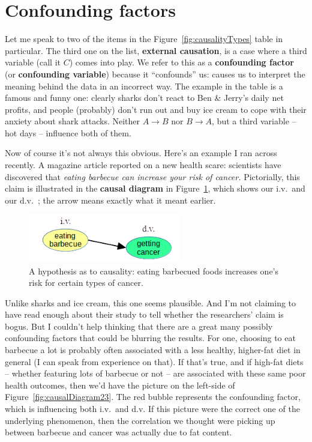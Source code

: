 \section{Confounding factors}


Let me speak to two of the items in the Figure~\ref{fig:causalityTypes} table
in particular. The third one on the list, \textbf{external causation}, is a
case where a third variable (call it $C$) comes into play. We refer to this as
a \textbf{confounding factor} (or \textbf{confounding variable}) because it
``confounds'' us: causes us to interpret the meaning behind the data in an
incorrect way. The example in the table is a famous and funny one: clearly
sharks don't react to Ben \& Jerry's daily net profits, and people (probably)
don't run out and buy ice cream to cope with their anxiety about shark attacks.
Neither $A \rightarrow B$ nor $B \rightarrow A$, but a third variable -- hot
days -- influence both of them.

\label{barbecue}

Now of course it's not always this obvious. Here's an example I ran across
recently. A magazine article reported on a new health scare: scientists have
discovered that \textit{eating barbecue can increase your risk of cancer.}
Pictorially, this claim is illustrated in the \textbf{causal diagram} in
Figure~\ref{fig:causalDiagram}, which shows our i.v.~and our d.v.~; the arrow
means exactly what it meant earlier.

\begin{figure}[ht]
\centering
\includegraphics[width=0.6\textwidth]{causalDiagram.png}
\caption{A hypothesis as to causality: eating barbecued foods increases one's
risk for certain types of cancer.}
\label{fig:causalDiagram}
\end{figure}

Unlike sharks and ice cream, this one seems plausible. And I'm not claiming to
have read enough about their study to tell whether the researchers' claim is
bogus. But I couldn't help thinking that there are a great many possibly
confounding factors that could be blurring the results. For one, choosing to
eat barbecue a lot is probably often associated with a less healthy, higher-fat
diet in general (I can speak from experience on that). If that's true, and if
high-fat diets -- whether featuring lots of barbecue or not -- are associated
with these same poor health outcomes, then we'd have the picture on the
left-side of Figure~\ref{fig:causalDiagram23}. The red bubble represents the
confounding factor, which is influencing both i.v.~and d.v. If this picture
were the correct one of the underlying phenomenon, then the correlation we
thought were picking up between barbecue and cancer was actually due to fat
content.

